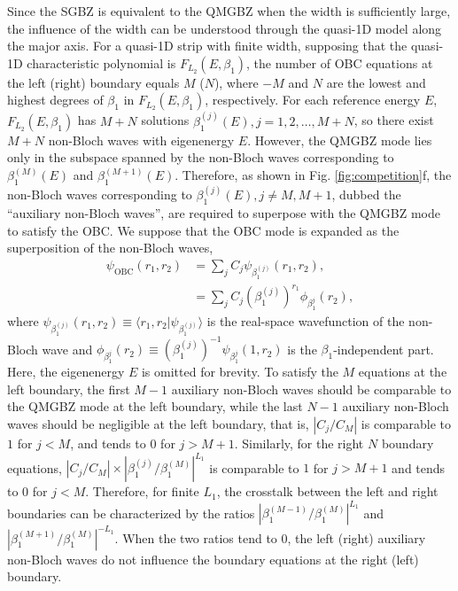Since the SGBZ is equivalent to the QMGBZ when the width is sufficiently
large, the influence of the width can be understood through the quasi-1D
model along the major axis. For a quasi-1D strip with finite width,
supposing that the quasi-1D characteristic polynomial is $F_{L_{2}}(E,\beta_{1})$,
the number of OBC equations at the left (right) boundary equals $M$
($N$), where $-M$ and $N$ are the lowest and highest degrees of
$\beta_{1}$ in $F_{L_{2}}(E,\beta_{1})$, respectively. For each
reference energy $E$, $F_{L_{2}}(E,\beta_{1})$ has $M+N$ solutions
$\beta_{1}^{(j)}(E),j=1,2,\dots,M+N$, so there exist $M+N$ non-Bloch
waves with eigenenergy $E$. However, the QMGBZ mode lies only in
the subspace spanned by the non-Bloch waves corresponding to $\beta_{1}^{(M)}(E)$
and $\beta_{1}^{(M+1)}(E)$. Therefore, as shown in Fig. \ref{fig:competition}f,
the non-Bloch waves corresponding to $\beta_{1}^{(j)}(E),j\neq M,M+1$,
dubbed the ``auxiliary non-Bloch waves'', are required to superpose
with the QMGBZ mode to satisfy the OBC. We suppose that the OBC mode
is expanded as the superposition of the non-Bloch waves, 
\begin{align}
\psi_{\text{OBC}}\left(r_{1},r_{2}\right) & =\sum_{j}C_{j}\psi_{\beta_{1}^{(j)}}\left(r_{1},r_{2}\right),\nonumber \\
 & =\sum_{j}C_{j}\left(\beta_{1}^{(j)}\right)^{r_{1}}\phi_{\beta_{1}^{j}}\left(r_{2}\right),
\end{align}
where $\psi_{\beta_{1}^{(j)}}(r_{1},r_{2})\equiv\langle r_{1},r_{2}|\psi_{\beta_{1}^{(j)}}\rangle$
is the real-space wavefunction of the non-Bloch wave and $\phi_{\beta_{1}^{j}}(r_{2})\equiv(\beta_{1}^{(j)})^{-1}\psi_{\beta_{1}^{j}}(1,r_{2})$
is the $\beta_{1}$-independent part. Here, the eigenenergy $E$ is
omitted for brevity. To satisfy the $M$ equations at the left boundary,
the first $M-1$ auxiliary non-Bloch waves should be comparable to
the QMGBZ mode at the left boundary, while the last $N-1$ auxiliary
non-Bloch waves should be negligible at the left boundary, that is,
$|C_{j}/C_{M}|$ is comparable to $1$ for $j<M$, and tends to $0$
for $j>M+1$. Similarly, for the right $N$ boundary equations, $|C_{j}/C_{M}|\times|\beta_{1}^{(j)}/\beta_{1}^{(M)}|^{L_{1}}$
is comparable to $1$ for $j>M+1$ and tends to $0$ for $j<M$. Therefore,
for finite $L_{1}$, the crosstalk between the left and right boundaries
can be characterized by the ratios $|\beta_{1}^{(M-1)}/\beta_{1}^{(M)}|^{L_{1}}$
and $|\beta_{1}^{(M+1)}/\beta_{1}^{(M)}|^{-L_{1}}$. When the two
ratios tend to $0$, the left (right) auxiliary non-Bloch waves do
not influence the boundary equations at the right (left) boundary.

